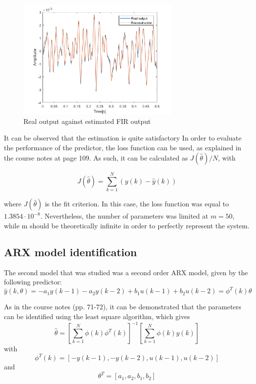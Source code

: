 \documentclass[a4paper,11pt]{article}
\begin{document}
\begin{figure}[H]
\centering
\includegraphics[height = 6cm]{images/y_FIR}
\caption{Real output against estimated FIR output}
\label{fig:y_FIR}
\end{figure}

It can be observed that the estimation is quite satisfactory In order to evaluate the performance of the predictor, the loss function can be used, as explained in the course notes at page 109. As such, it can be calculated as $J(\hat{\theta})/N$, with

\begin{equation}
J(\hat{\theta}) = \sum\limits_{k=1}^N(y(k)-\hat{y}(k))
\end{equation}

where $J(\hat{\theta})$ is the fit criterion. In this case, the loss function was equal to $1.3854\cdot10^{-8}$. Nevertheless, the number of parameters was limited at $m=50$, while m should be theoretically infinite in order to perfectly represent the system. 


\subsection{ARX model identification}
The second model that was studied was a second order ARX model, given by the following predictor:
\begin{equation}
\hat{y}(k,\theta) = -a_1y(k-1)-a_2y(k-2) + b_1u(k-1) + b_2u(k-2) = \phi^T(k)\theta
\end{equation}

As in the course notes (pp. 71-72), it can be demonstrated that the parameters can be identified using the least square algorithm, which gives
\begin{equation}
\hat{\theta} = \left[ \sum\limits_{k=1}^N \phi(k)\phi^T(k)\right]^{-1}\left[ \sum\limits_{k=1}^N \phi(k)y(k)\right]
\end{equation}
with
\begin{equation}
\phi^T(k)=[-y(k-1),-y(k-2),u(k-1),u(k-2)]
\end{equation}
and
\begin{equation}
\theta^T=[a_1,a_2,b_1,b_2]
\end{equation}
\end{document}
